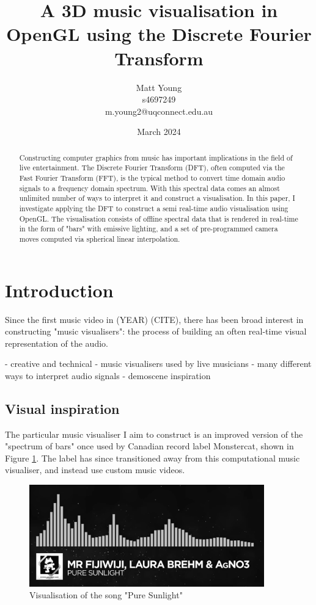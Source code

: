 \documentclass[11pt]{article}
\title{\textbf{A 3D music visualisation in OpenGL using the Discrete Fourier Transform}}
\author{Matt Young \\ s4697249 \\ m.young2@uqconnect.edu.au}
\date{March 2024}
\begin{document}
\maketitle

\begin{abstract}
    Constructing computer graphics from music has important implications in the field of live entertainment.
    The Discrete Fourier Transform (DFT), often computed via the Fast Fourier Transform (FFT), is the typical
    method to convert time domain audio signals to a frequency domain spectrum. With this spectral data comes
    an almost unlimited number of ways to interpret it and construct a visualisation. In this paper, I
    investigate applying the DFT to construct a semi real-time audio visualisation using OpenGL. The
    visualisation consists of offline spectral data that is rendered in real-time in the form of "bars" with
    emissive lighting, and a set of pre-programmed camera moves computed via spherical linear interpolation.
\end{abstract}

\tableofcontents

\clearpage
\listoffigures
\clearpage

\section{Introduction}
Since the first music video in (YEAR) (CITE), there has been broad interest in constructing "music
visualisers": the process of building an often real-time visual representation of the audio.

- creative and technical
- music visualisers used by live musicians
- many different ways to interpret audio signals
- demoscene inspiration

\subsection{Visual inspiration}
The particular music visualiser I aim to construct is an improved version of the "spectrum of bars" once used
by Canadian record label Monstercat, shown in Figure \ref{monstercat}. The label has since transitioned away
from this computational music visualiser, and instead use custom music videos.

\begin{figure}[H]
\centering
\includegraphics[width=384px]{img/monstercat.png}
\caption{Visualisation of the song "Pure Sunlight" \cite{youtubeElectronicFijiWiji}}
\label{monstercat}
\end{figure}
\end{document}
